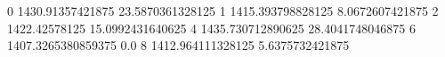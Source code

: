 0 1430.91357421875 23.5870361328125
1 1415.393798828125 8.0672607421875
2 1422.42578125 15.0992431640625
4 1435.730712890625 28.4041748046875
6 1407.3265380859375 0.0
8 1412.964111328125 5.6375732421875
